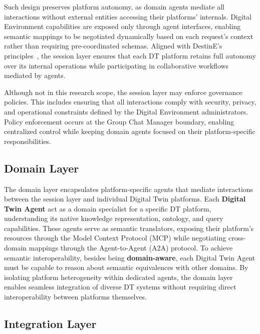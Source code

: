 Such design preserves platform autonomy,
    as domain agents mediate all interactions without external entities
    accessing their platforms' internals.
Digital Environment capabilities are exposed only through agent interfaces,
    enabling semantic mappings to be negotiated dynamically based on each request's context
    rather than requiring pre-coordinated schemas.
Aligned with DestinE's principles~\cite{Nativi_2021}, the session layer ensures that
    each DT platform retains full autonomy over its internal operations while
    participating in collaborative workflows mediated by agents.

Although not in this research scope, the session layer may enforce governance policies.
This includes ensuring that all interactions comply with
    security, privacy, and operational constraints
    defined by the Digital Environment administrators.
Policy enforcement occurs at the Group Chat Manager boundary, enabling centralized control
    while keeping domain agents focused on their platform-specific responsibilities.

\subsection{Domain Layer}
\label{subsec:domain-layer}

The domain layer encapsulates platform-specific agents that
    mediate interactions between the session layer and individual Digital Twin platforms.
Each \textbf{Digital Twin Agent} act as a domain specialist for a specific DT platform,
    understanding its native knowledge representation, ontology, and query capabilities.
These agents serve as semantic translators,
    exposing their platform's resources through the Model Context Protocol (MCP)
    while negotiating cross-domain mappings through the Agent-to-Agent (A2A) protocol.
To achieve semantic interoperability, besides being \textbf{domain-aware},
    each Digital Twin Agent must be capable to reason about
    semantic equivalences with other domains.
By isolating platform heterogeneity within dedicated agents,
    the domain layer enables seamless integration of diverse DT systems
    without requiring direct interoperability between platforms themselves.

\subsection{Integration Layer}
\label{subsec:integration-layer}

